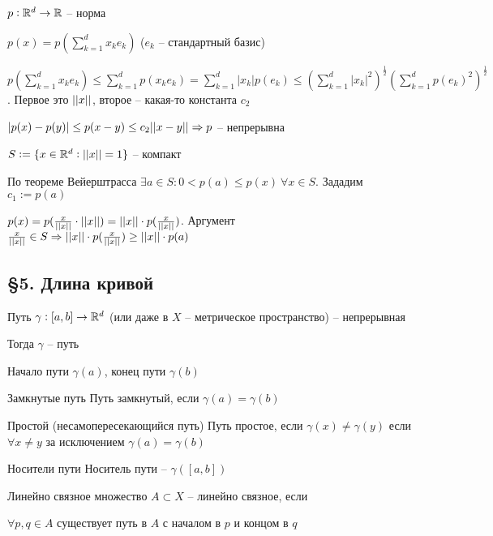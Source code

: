 \documentclass[12pt]{article}
\begin{document}
$p : \mathbb R^d \to \mathbb R$ -- норма

$p(x) = p(\sum\limits_{k = 1}^d x_ke_k)$ ($e_k$ -- стандартный базис)

$p(\sum\limits_{k = 1}^d x_ke_k) \leq \sum\limits_{k = 1}^d p(x_ke_k) = \sum\limits_{k = 1}^d |x_k|p(e_k) \leq (\sum\limits_{k = 1}^d |x_k|^2)^\frac{1}{2}(\sum\limits_{k = 1}^d p(e_k)^2)^\frac{1}{2}$. Первое это $|| x ||$, второе -- какая-то константа $c_2$

$|p(x) - p(y)| \leq p(x - y) \leq c_2 || x - y || \Rightarrow p$ -- непрерывна

$S := \{x \in \mathbb R^d : || x || = 1\}$ -- компакт

По теореме Вейерштрасса $\exists a \in S : 0 < p(a) \leq p(x)\ \forall x \in S$. Зададим $c_1 := p(a)$

$p(x) = p(\frac{x}{|| x ||} \cdot || x ||) = || x || \cdot p(\frac{x}{|| x ||})$. Аргумент $\frac{x}{|| x ||} \in S \Rightarrow || x || \cdot p(\frac{x}{|| x ||}) \geq || x || \cdot p(a)$

\newpage

\subsection{\S 5. Длина кривой}

\begin{defin}{Путь}
    $\gamma : [a, b] \to \mathbb R^d$ (или даже в $X$ -- метрическое пространство) -- непрерывная

    Тогда $\gamma$ -- путь

    Начало пути $\gamma(a)$, конец пути $\gamma(b)$
\end{defin}

\begin{defin}{Замкнутые путь}
    Путь замкнутый, если $\gamma(a) = \gamma(b)$
\end{defin}

\begin{defin}{Простой (несамопересекающийся путь)}
    Путь простое, если $\gamma(x) \neq \gamma(y)$ если $\forall x \neq y$ за исключением $\gamma(a) = \gamma(b)$
\end{defin}

\begin{defin}{Носители пути}
    Носитель пути -- $\gamma([a, b])$
\end{defin}

\begin{defin}{Линейно связное множество}
    $A \subset X$ -- линейно связное, если 

    $\forall p, q \in A$ существует путь в $A$ с началом в $p$ и концом в $q$    
\end{defin}
\end{document}

